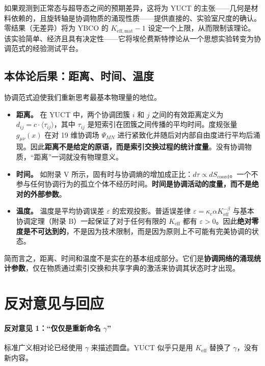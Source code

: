 \documentclass[12pt,a4paper]{article}
\begin{document}
	如果观测到正常态与超导态之间的预期差异，这将为 YUCT 的主张——几何是材料依赖的，且旋转轴是协调物质的涌现性质——提供直接的、实验室尺度的确认。零结果（无差异）将为 YBCO 的 \(K_{\mathrm{eff,mat}} - 1\) 设定一个上限，从而限制该理论。该实验简单、经济且具有决定性——它将埃伦费斯特悖论从一个思想实验转变为协调范式的经验测试平台。
	
	\subsection{本体论后果：距离、时间、温度}
	
	协调范式迫使我们重新思考最基本物理量的地位。
	
	\begin{itemize}
		\item \textbf{距离。} 在 YUCT 中，两个协调团簇 \(i\) 和 \(j\) 之间的有效距离定义为 \(d_{ij} = c \cdot \langle \tau_{ij} \rangle\)，其中 \(\tau_{ij}\) 是短索引在团簇之间传播的平均时间。度规张量 \(g_{\mu\nu}(x)\) 在对 19 维协调场 \(\Psi_{MN}\) 进行紧致化并随后对内部自由度进行平均后涌现。因此\textbf{距离不是给定的原语，而是索引交换过程的统计度量}。没有协调物质，“距离”一词就没有物理意义。
		
		\item \textbf{时间。} 如附录 V 所示，固有时与协调熵的增加成正比：\(d\tau \propto dS_{\mathrm{coord}}\)。一个不参与任何协调行为的孤立个体不经历时间。\textbf{时间是协调活动的度量，而不是绝对的外部参数}。
		
		\item \textbf{温度。} 温度是平均协调误差 \(\varepsilon\) 的宏观投影。普适误差律 \(\varepsilon = \kappa_c \alpha K_{\mathrm{eff}}^{-\beta}\) 与基本协调定理（附录 B）一起保证了对于任何有限的 \(K_{\mathrm{eff}}\) 都有 \(\varepsilon > 0\)。因此\textbf{绝对零度是不可达到的}，不是因为技术限制，而是因为原则上不可能有完美协调的状态。
	\end{itemize}
	
	简而言之，距离、时间和温度不是实在的基本组成部分。它们是\textbf{协调网络的涌现统计参数}，仅在物质通过索引交换和共享字典的激活来协调其状态时才出现。
	
	\section{反对意见与回应}
	\label{sec:objections}
	
	\paragraph{反对意见 1：“仅仅是重新命名 \(\gamma\)”}
	标准广义相对论已经使用 \(\gamma\) 来描述圆盘。YUCT 似乎只是用 \(K_{\mathrm{eff}}\) 替换了 \(\gamma\)，没有新内容。
	
\end{document}
